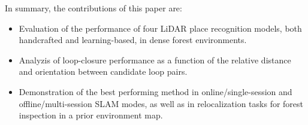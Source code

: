 In summary, the contributions of this paper are:
\begin{itemize}

\item Evaluation of the performance of four LiDAR place recognition models, both handcrafted and learning-based, in dense forest environments.

\item Analyzis of loop-closure performance as a function of the relative distance and orientation between candidate loop pairs.

\item Demonstration of the best performing method in online/single-session and offline/multi-session SLAM modes, as well as in relocalization tasks for forest inspection in a prior environment map. 

\end{itemize}









